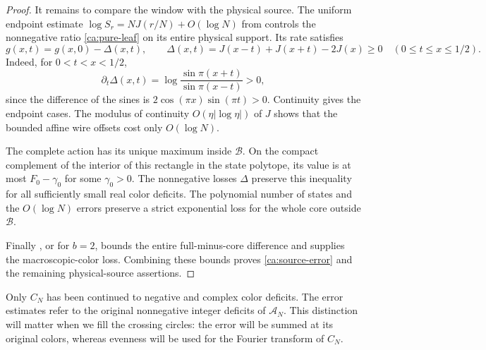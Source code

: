 \begin{proof}
It remains to compare the window with the physical source.
The uniform endpoint estimate
$\log S_r=NJ(r/N)+O(\log N)$ from \cite[Lemma 6.2]{Newton}
controls the nonnegative ratio \eqref{ca:pure-leaf} on its entire
physical support. Its rate satisfies
\[
 g(x,t)=g(x,0)-\Delta(x,t),\qquad
 \Delta(x,t)=J(x-t)+J(x+t)-2J(x)\ge0
 \quad(0\le t\le x\le1/2).
\]
Indeed, for $0<t<x<1/2$,
\[
 \partial_t\Delta(x,t)=
 \log\frac{\sin\pi(x+t)}{\sin\pi(x-t)}>0,
\]
since the difference of the sines is
$2\cos(\pi x)\sin(\pi t)>0$.
Continuity gives the endpoint cases.
The modulus of continuity $O(\eta|\log\eta|)$ of $J$ shows that
the bounded affine wire offsets cost only $O(\log N)$.

The complete action has its unique maximum inside $\mathcal B$.
On the compact complement of the interior of this rectangle in the
state polytope, its value is at most $F_0-\gamma_0$ for some
$\gamma_0>0$. The nonnegative losses $\Delta$ preserve this
inequality for all sufficiently small real color deficits. The polynomial number of states and the
$O(\log N)$ errors preserve a strict exponential loss for the
whole core outside $\mathcal B$.

Finally \cite[Theorem 1.1]{Bounds}, or
\cite[Corollary 9.1]{Bounds} for $b=2$, bounds the entire
full-minus-core difference and supplies the macroscopic-color loss.
Combining these bounds proves \eqref{ca:source-error} and the
remaining physical-source assertions.
\end{proof}

Only $C_N$ has been continued to negative and complex color deficits.
The error estimates refer to the original nonnegative integer deficits
of $\mathcal A_N$. This distinction will matter when we fill the
crossing circles: the error will be summed at its original colors,
whereas evenness will be used for the Fourier transform of $C_N$.
